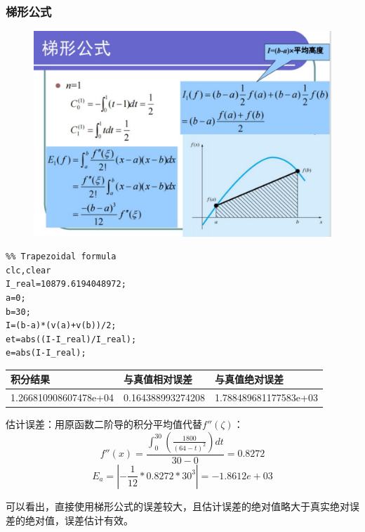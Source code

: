 \documentclass[a4paper,12pt]{ctexart}
\begin{document}
\subsubsection{梯形公式}
\begin{figure}[H]
    \centering
    \includegraphics[width=14cm]{第五章作业/tixing.jpg}
\end{figure}
\begin{lstlisting}
%% Trapezoidal formula
clc,clear
I_real=10879.6194048972;
a=0;
b=30;
I=(b-a)*(v(a)+v(b))/2;
et=abs((I-I_real)/I_real);
e=abs(I-I_real);
\end{lstlisting}
\begin{table}[H]
    \centering
    \begin{tabular}{lll}
        \hline
        积分结果              & 与真值相对误差    & 与真值绝对误差        \\ \hline
        1.266810908607478e+04 & 0.164388993274208 & 1.788489681177583e+03 \\ \hline
    \end{tabular}
\end{table}
\par
估计误差：用原函数二阶导的积分平均值代替$f''(\zeta)$：
\begin{equation}
    f''(x)=\frac{\int_{0}^{30}(\frac{1800}{(64-t)^2})dt}{30-0}=0.8272
\end{equation}
\begin{equation}
    E_a=|-\frac{1}{12}*0.8272*30^3|=-1.8612e+03
\end{equation}
\par
可以看出，直接使用梯形公式的误差较大，且估计误差的绝对值略大于真实绝对误差的绝对值，误差估计有效。
\end{document}
